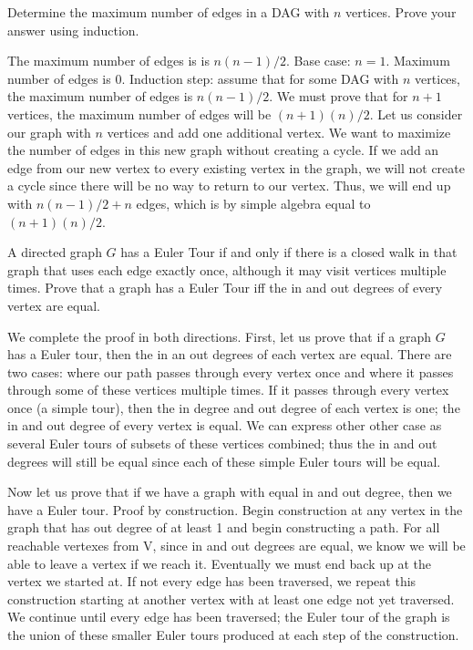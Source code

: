 \documentclass[solution, letterpaper]{cs20}
\begin{document}



\subproblem Determine the maximum number of edges in a DAG with $n$ vertices.
\subproblem Prove your answer using induction.  

\begin{solution}
\subsolution The maximum number of edges is is $n(n-1)/2$. 
\subsolution Base case: $n = 1$. Maximum number of edges is 0. 
Induction step: assume that for some DAG with $n$ vertices, the maximum number of edges is $n(n-1)/2$. We must prove that for $n+1$ vertices, the maximum number of edges will be $(n+1)(n)/2$. Let us consider our graph with $n$ vertices and add one additional vertex.  We want to maximize the number of edges in this new graph without creating a cycle. If we add an edge from our new vertex to every existing vertex in the graph, we will not create a cycle since there will be no way to return to our vertex. Thus, we will end up with $n(n-1)/2 + n$ edges, which is by simple algebra equal to $(n+1)(n)/2$. 
\end{solution}


A directed graph $G$ has a Euler Tour if and only if there is a closed walk in that graph that uses each edge exactly once, although it may visit vertices multiple times. Prove that a graph has a Euler Tour iff the in and out degrees of every vertex are equal. 

\begin{solution}
We complete the proof in both directions. First, let us prove that if a graph $G$ has a Euler tour, then the in an out degrees of each vertex are equal. There are two cases: where our path passes through every vertex once and where it passes through some of these vertices multiple times. If it passes through every vertex once (a simple tour), then the in degree and out degree of each vertex is one; the in and out degree of every vertex is equal. We can express other other case as several Euler tours of subsets of these vertices combined; thus the in and out degrees will still be equal since each of these simple Euler tours will be equal. 

Now let us prove that if we have a graph with equal in and out degree, then we have a Euler tour. Proof by construction. Begin construction at any vertex in the graph that has out degree of at least 1 and begin constructing a path. For all reachable vertexes from V, since in and out degrees are equal, we know we will be able to leave a vertex if we reach it. Eventually we must end back up at the vertex we started at. If not every edge has been traversed, we repeat this construction starting at another vertex with at least one edge not yet traversed. We continue until every edge has been traversed; the Euler tour of the graph is the union of these smaller Euler tours produced at each step of the construction. 

\end{solution}
\end{document}
